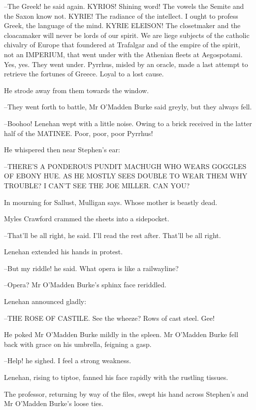 --The Greek! he said again. KYRIOS! Shining word! The vowels the Semite
and the Saxon know not. KYRIE! The radiance of the intellect. I ought to
profess Greek, the language of the mind. KYRIE ELEISON! The closetmaker
and the cloacamaker will never be lords of our spirit. We are liege
subjects of the catholic chivalry of Europe that foundered at Trafalgar
and of the empire of the spirit, not an IMPERIUM, that went under with the
Athenian fleets at Aegospotami. Yes, yes. They went under. Pyrrhus, misled
by an oracle, made a last attempt to retrieve the fortunes of Greece.
Loyal to a lost cause.

He strode away from them towards the window.

--They went forth to battle, Mr O'Madden Burke said greyly, but they
always fell.

--Boohoo! Lenehan wept with a little noise. Owing to a brick received in
the latter half of the MATINEE. Poor, poor, poor Pyrrhus!

He whispered then near Stephen's ear:



  --THERE'S A PONDEROUS PUNDIT MACHUGH
    WHO WEARS GOGGLES OF EBONY HUE.
    AS HE MOSTLY SEES DOUBLE
    TO WEAR THEM WHY TROUBLE?
    I CAN'T SEE THE JOE MILLER. CAN YOU?


In mourning for Sallust, Mulligan says. Whose mother is beastly dead.

Myles Crawford crammed the sheets into a sidepocket.

--That'll be all right, he said. I'll read the rest after. That'll be all
right.

Lenehan extended his hands in protest.

--But my riddle! he said. What opera is like a railwayline?

--Opera? Mr O'Madden Burke's sphinx face reriddled.

Lenehan announced gladly:


--THE ROSE OF CASTILE. See the wheeze? Rows of cast steel. Gee!

He poked Mr O'Madden Burke mildly in the spleen. Mr O'Madden Burke
fell back with grace on his umbrella, feigning a gasp.

--Help! he sighed. I feel a strong weakness.

Lenehan, rising to tiptoe, fanned his face rapidly with the rustling
tissues.

The professor, returning by way of the files, swept his hand across
Stephen's and Mr O'Madden Burke's loose ties.

